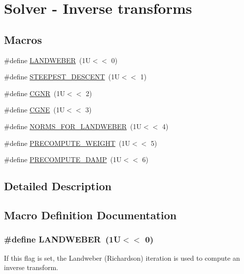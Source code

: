 \hypertarget{group__solver}{\section{Solver -\/ Inverse transforms}
\label{group__solver}
}
\subsection*{Macros}
\begin{DoxyCompactItemize}
\item 
\#define \hyperlink{group__solver_ga84bae5d48296d5a0d1e548ed58b9e495}{L\-A\-N\-D\-W\-E\-B\-E\-R}~(1\-U$<$$<$ 0)
\item 
\#define \hyperlink{group__solver_ga1f016d06d661c80eacb5182d80813cd9}{S\-T\-E\-E\-P\-E\-S\-T\-\_\-\-D\-E\-S\-C\-E\-N\-T}~(1\-U$<$$<$ 1)
\item 
\#define \hyperlink{group__solver_ga5716b96b5141dfb52b747a78b11defa7}{C\-G\-N\-R}~(1\-U$<$$<$ 2)
\item 
\#define \hyperlink{group__solver_gaae8290aa6a83fd56699a98cc0a55baf5}{C\-G\-N\-E}~(1\-U$<$$<$ 3)
\item 
\#define \hyperlink{group__solver_ga6be0dda24e7cbd9f3f1d1b299e815973}{N\-O\-R\-M\-S\-\_\-\-F\-O\-R\-\_\-\-L\-A\-N\-D\-W\-E\-B\-E\-R}~(1\-U$<$$<$ 4)
\item 
\#define \hyperlink{group__solver_gaa59267dba2cd3247c5ee4eb493d31c2d}{P\-R\-E\-C\-O\-M\-P\-U\-T\-E\-\_\-\-W\-E\-I\-G\-H\-T}~(1\-U$<$$<$ 5)
\item 
\#define \hyperlink{group__solver_ga9ccacd28b2d441a797a5c0d9e6c17fa7}{P\-R\-E\-C\-O\-M\-P\-U\-T\-E\-\_\-\-D\-A\-M\-P}~(1\-U$<$$<$ 6)
\end{DoxyCompactItemize}


\subsection{Detailed Description}


\subsection{Macro Definition Documentation}
\hypertarget{group__solver_ga84bae5d48296d5a0d1e548ed58b9e495}{
\subsubsection[{L\-A\-N\-D\-W\-E\-B\-E\-R}]{\setlength{\rightskip}{0pt plus 5cm}\#define L\-A\-N\-D\-W\-E\-B\-E\-R~(1\-U$<$$<$ 0)}}\label{group__solver_ga84bae5d48296d5a0d1e548ed58b9e495}
If this flag is set, the Landweber (Richardson) iteration is used to compute an inverse transform.

